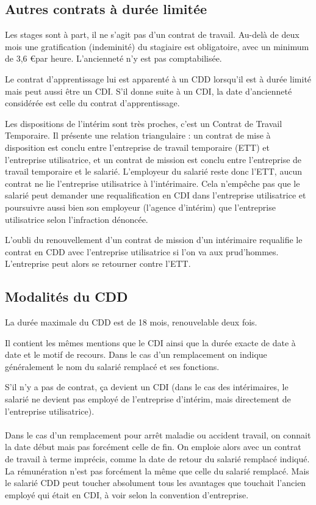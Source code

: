 \subsection{Autres contrats à durée limitée}
	Les stages sont à part, il ne s'agit pas d'un contrat de travail.
	Au-delà de deux mois une gratification (indeminité) du stagiaire est obligatoire, avec un minimum de 3,6 \euro par heure.
	L'ancienneté n'y est pas comptabilisée.
	
	Le contrat d'apprentissage lui est apparenté à un CDD lorsqu'il est à durée limité mais peut aussi être un CDI.
	S'il donne suite à un CDI, la date d'ancienneté considérée est celle du contrat d'apprentissage.

	Les dispositions de l'intérim sont très proches, c'est un Contrat de Travail Temporaire.
	Il présente une relation triangulaire : un contrat de mise à disposition est conclu entre l'entreprise de travail temporaire (ETT) et l'entreprise utilisatrice, et un contrat de mission est conclu entre l'entreprise de travail temporaire et le salarié.
	L'employeur du salarié reste donc l'ETT, aucun contrat ne lie l'entreprise utilisatrice à l'intérimaire.
	Cela n'empêche pas que le salarié peut demander une requalification en CDI dans l'entreprise utilisatrice et poursuivre aussi bien son employeur (l'agence d'intérim) que l'entreprise utilisatrice selon l'infraction dénoncée.
	
	L'oubli du renouvellement d'un contrat de mission d'un intérimaire requalifie le contrat en CDD avec l'entreprise utilisatrice si l'on va aux prud'hommes.
	L'entreprise peut alors se retourner contre l'ETT.


\subsection{Modalités du CDD}
	La durée maximale du CDD est de 18 mois, renouvelable deux fois.

	Il contient les mêmes mentions que le CDI ainsi que la durée exacte de date à date et le motif de recours.
	Dans le cas d'un remplacement on indique généralement le nom du salarié remplacé et ses fonctions.
	
	S’il n’y a pas de contrat, ça devient un CDI (dans le cas des intérimaires, le salarié ne devient pas employé de l'entreprise d’intérim, mais directement de l'entreprise utilisatrice).

	\paragraph{}
	Dans le cas d’un remplacement pour arrêt maladie ou accident travail, on connait la date début mais pas forcément celle de fin.
	On emploie alors avec un contrat de travail à terme imprécis, comme la date de retour du salarié remplacé indiqué.
	La rémunération n’est pas forcément la même que celle du salarié remplacé.
	Mais le salarié CDD peut toucher absolument tous les avantages que touchait l’ancien employé qui était en CDI, à voir selon la convention d'entreprise.
	
